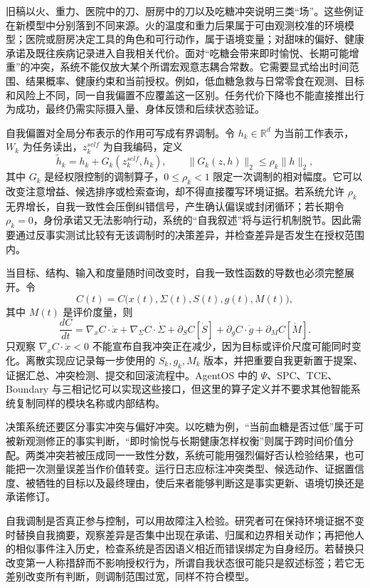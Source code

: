 旧稿以火、重力、医院中的刀、厨房中的刀以及吃糖冲突说明三类“场”。这些例证在新模型中分别落到不同来源。火的温度和重力后果属于可由观测校准的环境模型；医院或厨房决定工具的角色和可行动作，属于语境变量；对甜味的偏好、健康承诺及既往疾病记录进入自我相关代价。面对“吃糖会带来即时愉悦、长期可能增重”的冲突，系统不能仅放大某个所谓宏观意志耦合常数。它需要显式给出时间范围、结果概率、健康约束和当前授权。例如，低血糖急救与日常零食在观测、目标和风险上不同，同一自我偏置不应覆盖这一区别。任务代价下降也不能直接推出行为成功，最终仍需实际摄入量、身体反馈和后续状态验证。

自我偏置对全局分布表示的作用可写成有界调制。令 $h_k\in\mathbb{R}^{d}$ 为当前工作表示，$W_k$ 为任务读出，$z_k^{self}$ 为自我编码，定义
\[
\tilde h_k=h_k+G_k(z_k^{self},h_k),\qquad
\|G_k(z,h)\|_2\le \rho_k\|h\|_2,
\]
其中 $G_k$ 是经权限控制的调制算子，$0\le\rho_k<1$ 限定一次调制的相对幅度。它可以改变注意增益、候选排序或检索查询，却不得直接覆写环境证据。若系统允许 $\rho_k$ 无界增长，自我一致性会压倒纠错信号，产生确认偏误或封闭循环；若长期令 $\rho_k=0$，身份承诺又无法影响行动，系统的“自我叙述”将与运行机制脱节。因此需要通过反事实测试比较有无该调制时的决策差异，并检查差异是否发生在授权范围内。

当目标、结构、输入和度量随时间改变时，自我一致性函数的导数也必须完整展开。令
\[
C(t)=C\bigl(x(t),\Sigma(t),S(t),g(t),M(t)\bigr),
\]
其中 $M(t)$ 是评价度量，则
\[
\frac{dC}{dt}=\nabla_xC\cdot\dot x+\nabla_{\Sigma}C\cdot\dot\Sigma
+\partial_SC[\dot S]+\partial_gC\cdot\dot g+\partial_MC[\dot M].
\]
只观察 $\nabla_xC\cdot\dot x<0$ 不能宣布自我冲突正在减少，因为目标或评价尺度可能同时变化。离散实现应记录每一步使用的 $S_k,g_k,M_k$ 版本，并把重要自我更新置于提案、证据汇总、冲突检测、提交和回滚流程中。AgentOS 中的 $\Psi$、SPC、TCE、Boundary 与三相记忆可以实现这些接口，但这里的算子定义并不要求其他智能系统复制同样的模块名称或内部结构。

决策系统还要区分事实冲突与偏好冲突。以吃糖为例，“当前血糖是否过低”属于可被新观测修正的事实判断，“即时愉悦与长期健康怎样权衡”则属于跨时间价值分配。两类冲突若被压成同一一致性分数，系统可能用强烈偏好否认检验结果，也可能把一次测量误差当作价值转变。运行日志应标注冲突类型、候选动作、证据置信度、被牺牲的目标以及最终理由，使后来者能够判断这是事实更新、语境切换还是承诺修订。

自我调制是否真正参与控制，可以用故障注入检验。研究者可在保持环境证据不变时替换自我摘要，观察差异是否集中出现在承诺、归属和边界相关动作；再把他人的相似事件注入历史，检查系统是否因语义相近而错误绑定为自身经历。若替换只改变第一人称措辞而不影响授权行为，所谓自我状态很可能只是叙述标签；若它无差别改变所有判断，则调制范围过宽，同样不符合模型。

